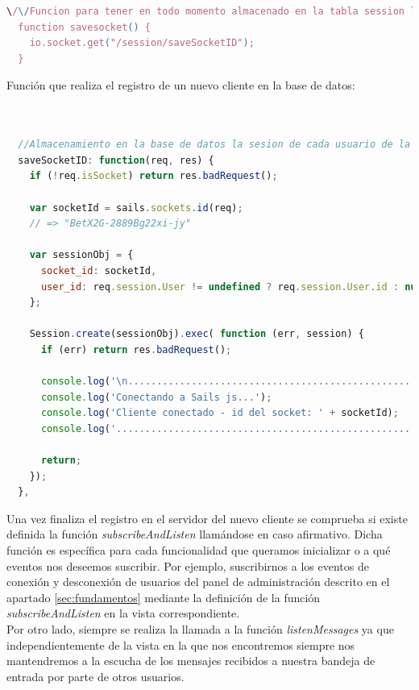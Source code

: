 \begin{lstlisting}[language=JavaScript]
  \/\/Funcion para tener en todo momento almacenado en la tabla session los sockets conectados junto con el usuario al que pertenece
  function savesocket() {
    io.socket.get("/session/saveSocketID");
  }  
\end{lstlisting}


Función que realiza el registro de un nuevo cliente en la base de datos:\\

\begin{lstlisting}[language=JavaScript]


  //Almacenamiento en la base de datos la sesion de cada usuario de la pagina
  saveSocketID: function(req, res) {
    if (!req.isSocket) return res.badRequest();

    var socketId = sails.sockets.id(req);
    // => "BetX2G-2889Bg22xi-jy"

    var sessionObj = {
      socket_id: socketId,
      user_id: req.session.User != undefined ? req.session.User.id : null
    };

    Session.create(sessionObj).exec( function (err, session) {
      if (err) return res.badRequest();

      console.log('\n....................................................');
      console.log('Conectando a Sails js...');
      console.log('Cliente conectado - id del socket: ' + socketId);
      console.log('....................................................');

      return;
    });
  },

\end{lstlisting}

Una vez finaliza el registro en el servidor del nuevo cliente se comprueba si existe definida la función \emph{ subscribeAndListen } llamándose en caso afirmativo. Dicha función es específica para cada
funcionalidad que queramos inicializar o a qué eventos nos deseemos suscribir. Por ejemplo, suscribirnos a los eventos de conexión y desconexión de usuarios del panel de administración descrito en el apartado
\ref{sec:fundamentos} mediante la definición de la función \emph{subscribeAndListen} en la vista correspondiente.\\


Por otro lado, siempre se realiza la llamada a la función \emph{listenMessages} ya que independientemente de la vista en la que nos encontremos siempre nos mantendremos a la escucha de los mensajes 
recibidos a nuestra bandeja de entrada por parte de otros usuarios.\\

